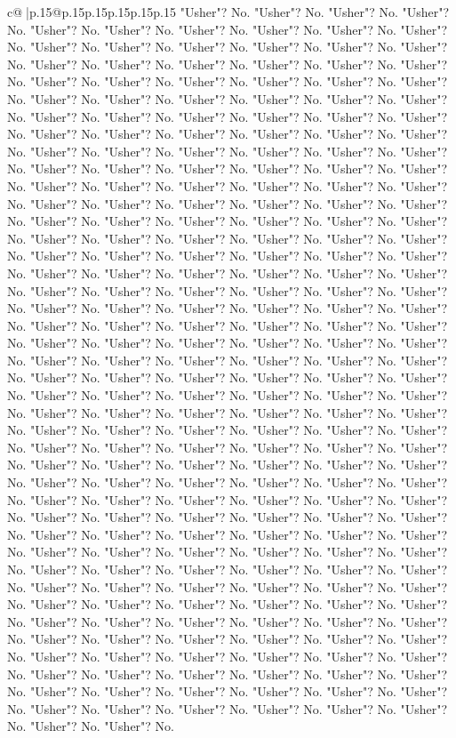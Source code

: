 \documentclass{article}
\begin{document}
{\begin{supertabular}{c@{$\;$}|p{.15\linewidth}@{}p{.15\linewidth}p{.15\linewidth}p{.15\linewidth}p{.15\linewidth}p{.15\linewidth}}
{{{"Usher"? No. "Usher"? No. "Usher"? No. "Usher"? No. "Usher"? No. "Usher"? No. "Usher"? No. "Usher"? No. "Usher"? No. "Usher"? No. "Usher"? No. "Usher"? No. "Usher"? No. "Usher"? No. "Usher"? No. "Usher"? No. "Usher"? No. "Usher"? No. "Usher"? No. "Usher"? No. "Usher"? No. "Usher"? No. "Usher"? No. "Usher"? No. "Usher"? No. "Usher"? No. "Usher"? No. "Usher"? No. "Usher"? No. "Usher"? No. "Usher"? No. "Usher"? No. "Usher"? No. "Usher"? No. "Usher"? No. "Usher"? No. "Usher"? No. "Usher"? No. "Usher"? No. "Usher"? No. "Usher"? No. "Usher"? No. "Usher"? No. "Usher"? No. "Usher"? No. "Usher"? No. "Usher"? No. "Usher"? No. "Usher"? No. "Usher"? No. "Usher"? No. "Usher"? No. "Usher"? No. "Usher"? No. "Usher"? No. "Usher"? No. "Usher"? No. "Usher"? No. "Usher"? No. "Usher"? No. "Usher"? No. "Usher"? No. "Usher"? No. "Usher"? No. "Usher"? No. "Usher"? No. "Usher"? No. "Usher"? No. "Usher"? No. "Usher"? No. "Usher"? No. "Usher"? No. "Usher"? No. "Usher"? No. "Usher"? No. "Usher"? No. "Usher"? No. "Usher"? No. "Usher"? No. "Usher"? No. "Usher"? No. "Usher"? No. "Usher"? No. "Usher"? No. "Usher"? No. "Usher"? No. "Usher"? No. "Usher"? No. "Usher"? No. "Usher"? No. "Usher"? No. "Usher"? No. "Usher"? No. "Usher"? No. "Usher"? No. "Usher"? No. "Usher"? No. "Usher"? No. "Usher"? No. "Usher"? No. "Usher"? No. "Usher"? No. "Usher"? No. "Usher"? No. "Usher"? No. "Usher"? No. "Usher"? No. "Usher"? No. "Usher"? No. "Usher"? No. "Usher"? No. "Usher"? No. "Usher"? No. "Usher"? No. "Usher"? No. "Usher"? No. "Usher"? No. "Usher"? No. "Usher"? No. "Usher"? No. "Usher"? No. "Usher"? No. "Usher"? No. "Usher"? No. "Usher"? No. "Usher"? No. "Usher"? No. "Usher"? No. "Usher"? No. "Usher"? No. "Usher"? No. "Usher"? No. "Usher"? No. "Usher"? No. "Usher"? No. "Usher"? No. "Usher"? No. "Usher"? No. "Usher"? No. "Usher"? No. "Usher"? No. "Usher"? No. "Usher"? No. "Usher"? No. "Usher"? No. "Usher"? No. "Usher"? No. "Usher"? No. "Usher"? No. "Usher"? No. "Usher"? No. "Usher"? No. "Usher"? No. "Usher"? No. "Usher"? No. "Usher"? No. "Usher"? No. "Usher"? No. "Usher"? No. "Usher"? No. "Usher"? No. "Usher"? No. "Usher"? No. "Usher"? No. "Usher"? No. "Usher"? No. "Usher"? No. "Usher"? No. "Usher"? No. "Usher"? No. "Usher"? No. "Usher"? No. "Usher"? No. "Usher"? No. "Usher"? No. "Usher"? No. "Usher"? No. "Usher"? No. "Usher"? No. "Usher"? No. "Usher"? No. "Usher"? No. "Usher"? No. "Usher"? No. "Usher"? No. "Usher"? No. "Usher"? No. "Usher"? No. "Usher"? No. "Usher"? No. "Usher"? No. "Usher"? No. "Usher"? No. "Usher"? No. "Usher"? No. "Usher"? No. "Usher"? No. "Usher"? No. "Usher"? No. "Usher"? No. "Usher"? No. "Usher"? No. "Usher"? No. "Usher"? No. "Usher"? No. "Usher"? No. "Usher"? No. "Usher"? No. "Usher"? No. "Usher"? No. "Usher"? No. "Usher"? No. "Usher"? No. "Usher"? No. "Usher"? No. "Usher"? No. "Usher"? No. "Usher"? No. "Usher"? No. "Usher"? No. "Usher"? No. "Usher"? No. "Usher"? No. "Usher"? No. "Usher"? No. "Usher"? No. "Usher"? No. "Usher"? No. "Usher"? No. "Usher"? No. "Usher"? No. "Usher"? No. "Usher"? No. "Usher"? No. "Usher"? No. "Usher"? No. "Usher"? No. "Usher"? No. "Usher"? No. "Usher"? No. "Usher"? No. "Usher"? No. "Usher"? No. "Usher"? No. "Usher"? No. "Usher"? No. }}}
\end{supertabular}}
\end{document}

